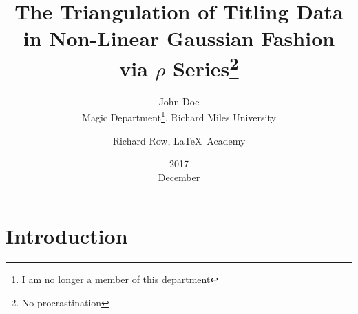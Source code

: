 \documentclass{article}%
\title{The Triangulation of Titling Data in Non-Linear Gaussian Fashion via $\rho$ Series\thanks{No procrastination}}
\date{2017\\ December}
\author{John Doe\\ Magic Department\thanks{I am no longer a member of this department}, Richard Miles University 
\and Richard Row, \LaTeX\ Academy}
\begin{document}
\maketitle
\section{Introduction}
\blindtext
\end{document}
